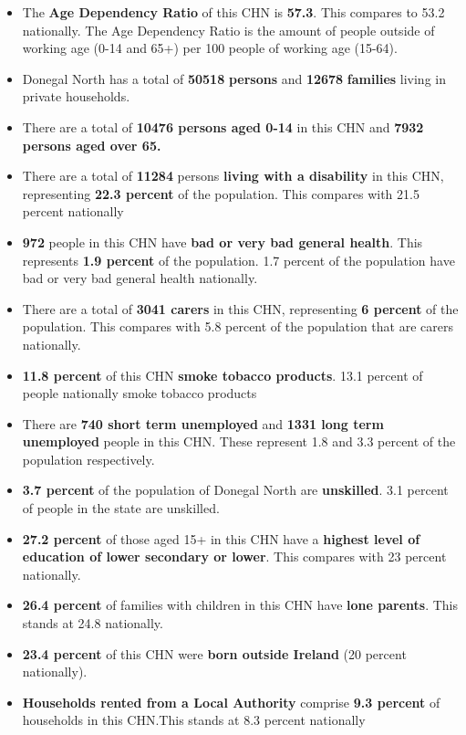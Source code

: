 \documentclass{article}
\begin{document}
\begin{itemize}

\item The \textbf{Age Dependency Ratio} of this CHN is  \textbf{57.3}. This compares to 53.2 nationally. The Age Dependency Ratio is the amount of people outside of working age (0-14 and 65+) per 100 people of working age (15-64). 

\item Donegal North has a total of \textbf{\num{50518}} \textbf{persons} and  \textbf{\num{12678}} \textbf{families} living in private households.

\item There are a total of \textbf{\num{10476} persons aged 0-14} in this CHN and \textbf{\num{7932} persons aged over 65.} 

\item There are a total of \textbf{\num{11284}} persons \textbf{living with a disability} in this CHN, representing \textbf{22.3 percent} of the population. This compares with  21.5 percent nationally

\item \textbf{\num{972}} people in this CHN have \textbf{bad or very bad general health}. This represents \textbf{1.9 percent} of the population. 1.7 percent of the population have bad or very bad general health nationally. 

\item There are a total of \textbf{\num{3041} carers} in this CHN, representing \textbf{6 percent} of the population. This compares with 5.8 percent of the population that are carers nationally. 

\item \textbf{11.8 percent} of this CHN \textbf{smoke tobacco products}. 13.1 percent of people nationally smoke tobacco products

\item There are \textbf{\num{740} short term unemployed} and \textbf{\num{1331} long term unemployed} people in this CHN. These represent 1.8 and 3.3 percent of the population respectively.

\item  \textbf{3.7 percent} of the population of Donegal North are \textbf{unskilled}. 3.1 percent of people in the state are unskilled.

\item \textbf{27.2 percent} of those aged 15+ in this CHN have a \textbf{highest level of education of lower secondary or lower}. This compares with 23 percent nationally. 

\item \textbf{26.4 percent} of families with children in this CHN have \textbf{lone parents}. This stands at 24.8 nationally.

\item \textbf{23.4 percent} of this CHN were \textbf{born outside Ireland} (20 percent nationally).

\item \textbf{Households rented from a Local Authority} comprise \textbf{9.3 percent} of households in this CHN.This stands at 8.3 percent nationally

\end{itemize}
\end{document}
